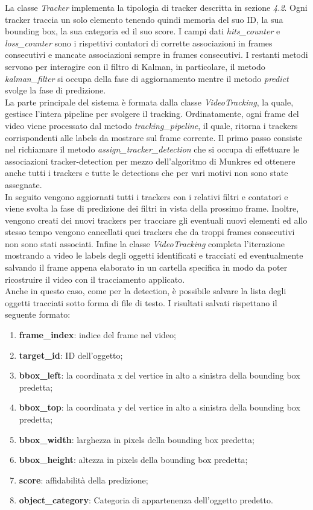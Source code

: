 La classe \textit{Tracker} implementa la tipologia di tracker descritta in sezione \textit{4.2}. Ogni tracker traccia un solo elemento tenendo quindi memoria del suo ID, la sua bounding box, la sua categoria ed il suo score. I campi dati \textit{hits\_counter} e \textit{loss\_counter} sono i rispettivi contatori di corrette associazioni in frames consecutivi e mancate associazioni sempre in frames consecutivi. I restanti metodi servono per interagire con il filtro di Kalman, in particolare, il metodo \textit{kalman\_filter} si occupa della fase di aggiornamento mentre il metodo \textit{predict} svolge la fase di predizione.\\
La parte principale del sistema è formata dalla classe \textit{VideoTracking}, la quale, gestisce l'intera pipeline per svolgere il tracking. Ordinatamente, ogni frame del video viene processato dal metodo \textit{tracking\_pipeline}, il quale, ritorna i trackers corrispondenti alle labels da mostrare sul frame corrente. Il primo passo consiste nel richiamare il metodo \textit{assign\_tracker\_detection} che si occupa di effettuare le associazioni tracker-detection per mezzo dell'algoritmo di Munkres ed ottenere anche tutti i trackers e tutte le detections che per vari motivi non sono state assegnate.\\
In seguito vengono aggiornati tutti i trackers con i relativi filtri e contatori e viene svolta la fase di predizione dei filtri in vista della prossimo frame. Inoltre, vengono creati dei nuovi trackers per tracciare gli eventuali nuovi elementi ed allo stesso tempo vengono cancellati quei trackers che da troppi frames consecutivi non sono stati associati. Infine la classe \textit{VideoTracking} completa l'iterazione mostrando a video le labels degli oggetti identificati e tracciati ed eventualmente salvando il frame appena elaborato in un cartella specifica in modo da poter ricostruire il video con il tracciamento applicato.\\
Anche in questo caso, come per la detection, è possibile salvare la lista degli oggetti tracciati sotto forma di file di testo. I risultati salvati rispettano il seguente formato:
\begin{enumerate}
\item \textbf{frame\_index}: indice del frame nel video;
\item \textbf{target\_id}: ID dell'oggetto;
\item \textbf{bbox\_left}: la coordinata x del vertice in alto a sinistra della bounding box predetta;
\item \textbf{bbox\_top}: la coordinata y del vertice in alto a sinistra della bounding box predetta;
\item \textbf{bbox\_width}: larghezza in pixels della bounding box predetta;
\item \textbf{bbox\_height}: altezza in pixels della bounding box predetta;
\item \textbf{score}: affidabilità della predizione;
\item \textbf{object\_category}: Categoria di appartenenza dell'oggetto predetto.
\end{enumerate}

